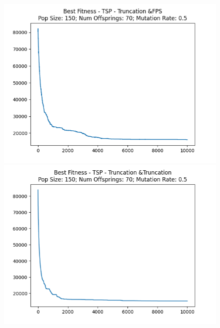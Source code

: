 \documentclass[12pt]{report}
\theoremstyle{mytheoremstyle}
\theoremstyle{mytheoremstyle}
\theoremstyle{myproblemstyle}
\begin{document}
\begin{figure}[!]
\begin{minipage}{0.4\textwidth}
		\includegraphics[width=\linewidth]{../Analysis/BSF_TSP_3_0_150_70.png}
	\end{minipage}
	\hspace{\fill}
	\begin{minipage}{0.4\textwidth}
		\includegraphics[width=\linewidth]{../Analysis/BSF_TSP_3_3_150_70.png}
	\end{minipage}
	\vspace*{1cm}
	\begin{minipage}{0.4\textwidth}

\end{minipage}
\end{figure}
\end{document}
